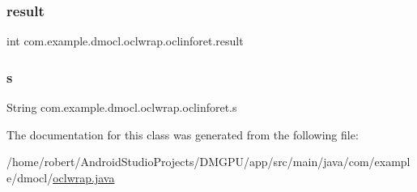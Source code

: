 \subsubsection{\texorpdfstring{result}{result}}
{\footnotesize\ttfamily int com.\+example.\+dmocl.\+oclwrap.\+oclinforet.\+result\hspace{0.3cm}{\ttfamily [package]}}

\mbox{\label{classcom_1_1example_1_1dmocl_1_1oclwrap_1_1oclinforet_add8b9475c43832f750644093b8d888ca}} 
\subsubsection{\texorpdfstring{s}{s}}
{\footnotesize\ttfamily String com.\+example.\+dmocl.\+oclwrap.\+oclinforet.\+s\hspace{0.3cm}{\ttfamily [package]}}



The documentation for this class was generated from the following file\+:\begin{DoxyCompactItemize}
\item 
/home/robert/\+Android\+Studio\+Projects/\+D\+M\+G\+P\+U/app/src/main/java/com/example/dmocl/\mbox{\hyperlink{oclwrap_8java}{oclwrap.\+java}}\end{DoxyCompactItemize}
